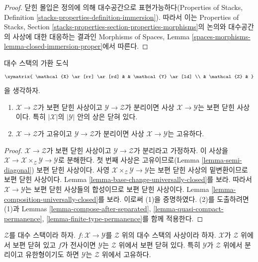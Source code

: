 \begin{proof}
닫힌 몰입은 정의에 의해 대수공간으로 표현가능하다(Properties of Stacks,
Definition \ref{stacks-properties-definition-immersion}). 따라서 이는
Properties of Stacks, Section
\ref{stacks-properties-section-properties-morphisms}의 논의와 대수공간의
사상에 대한 대응하는 결과인 Morphisms of Spaces, Lemma
\ref{spaces-morphisms-lemma-closed-immersion-proper}에서 따른다.
\end{proof}

\begin{lemma}
\label{lemma-universally-closed-permanence}
대수 스택의 가환 도식
$$
\xymatrix{
\mathcal{X} \ar[rr] \ar[rd] & &
\mathcal{Y} \ar[ld] \\
& \mathcal{Z} &
}
$$
을 생각하자.
\begin{enumerate}
\item $\mathcal{X} \to \mathcal{Z}$가 보편 닫힌 사상이고
$\mathcal{Y} \to \mathcal{Z}$가 분리이면 사상
$\mathcal{X} \to \mathcal{Y}$는 보편 닫힌 사상이다. 특히
$|\mathcal{X}|$의 $|\mathcal{Y}|$ 안의 상은 닫혀 있다.
\item $\mathcal{X} \to \mathcal{Z}$가 고유이고
$\mathcal{Y} \to \mathcal{Z}$가 분리이면 사상
$\mathcal{X} \to \mathcal{Y}$는 고유하다.
\end{enumerate}
\end{lemma}

\begin{proof}
$\mathcal{X} \to \mathcal{Z}$가 보편 닫힌 사상이고
$\mathcal{Y} \to \mathcal{Z}$가 분리라고 가정하자. 이 사상을
$\mathcal{X} \to \mathcal{X} \times_\mathcal{Z} \mathcal{Y} \to
\mathcal{Y}$로 분해한다. 첫 번째 사상은 고유이므로(Lemma
\ref{lemma-semi-diagonal}) 보편 닫힌 사상이다. 사영
$\mathcal{X} \times_\mathcal{Z} \mathcal{Y} \to \mathcal{Y}$는 보편
닫힌 사상의 밑변환이므로 보편 닫힌 사상이다. Lemma
\ref{lemma-base-change-universally-closed}를 보라. 따라서
$\mathcal{X} \to \mathcal{Y}$는 보편 닫힌 사상들의 합성이므로 보편
닫힌 사상이다. Lemma \ref{lemma-composition-universally-closed}를 보라.
이로써 (1)을 증명하였다. (2)를 도출하려면 (1)과 Lemmas
\ref{lemma-compose-after-separated},
\ref{lemma-quasi-compact-permanence},
\ref{lemma-finite-type-permanence}를 함께 적용한다.
\end{proof}

\begin{lemma}
\label{lemma-image-proper-is-proper}
$\mathcal{Z}$를 대수 스택이라 하자.
$f : \mathcal{X} \to \mathcal{Y}$를 $\mathcal{Z}$ 위의 대수 스택의
사상이라 하자. $\mathcal{X}$가 $\mathcal{Z}$ 위에서 보편 닫혀 있고
$f$가 전사이면 $\mathcal{Y}$는 $\mathcal{Z}$ 위에서 보편 닫혀 있다.
특히 $\mathcal{Y}$가 $\mathcal{Z}$ 위에서 분리이고 유한형이기도 하면
$\mathcal{Y}$는 $\mathcal{Z}$ 위에서 고유하다.
\end{lemma}

